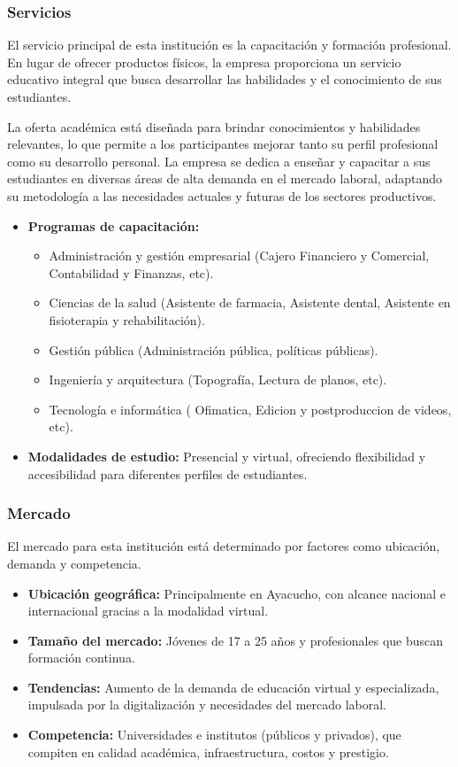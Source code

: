 \subsubsection{Servicios}
El servicio principal de esta institución es la capacitación y formación profesional. En lugar de ofrecer productos físicos, la empresa proporciona un servicio educativo integral que busca desarrollar las habilidades y el conocimiento de sus estudiantes.

La oferta académica está diseñada para brindar conocimientos y habilidades relevantes, lo que permite a los participantes mejorar tanto su perfil profesional como su desarrollo personal. La empresa se dedica a enseñar y capacitar a sus estudiantes en diversas áreas de alta demanda en el mercado laboral, adaptando su metodología a las necesidades actuales y futuras de los sectores productivos.

\begin{itemize}
	\item \textbf{Programas de capacitación:}
	
	\begin{itemize}
		\item Administración y gestión empresarial (Cajero Financiero y Comercial, Contabilidad y Finanzas, etc).
		\item Ciencias de la salud (Asistente de farmacia, Asistente dental, Asistente en fisioterapia y rehabilitación).
		\item Gestión pública (Administración pública, políticas públicas).
		\item Ingeniería y arquitectura (Topografía, Lectura de planos, etc).
		\item Tecnología e informática ( Ofimatica, Edicion y postproduccion de videos, etc).
	\end{itemize}
	
	
	\item \textbf{Modalidades de estudio:} Presencial y virtual, ofreciendo flexibilidad y accesibilidad para diferentes perfiles de estudiantes.
\end{itemize}

\subsubsection{Mercado}
El mercado para esta institución está determinado por factores como ubicación, demanda y competencia.

\begin{itemize}
	\item \textbf{Ubicación geográfica:} Principalmente en Ayacucho, con alcance nacional e internacional gracias a la modalidad virtual.
	\item \textbf{Tamaño del mercado:} Jóvenes de 17 a 25 años y profesionales que buscan formación continua.
	\item \textbf{Tendencias:} Aumento de la demanda de educación virtual y especializada, impulsada por la digitalización y necesidades del mercado laboral.
	\item \textbf{Competencia:} Universidades e institutos (públicos y privados), que compiten en calidad académica, infraestructura, costos y prestigio.
\end{itemize}

